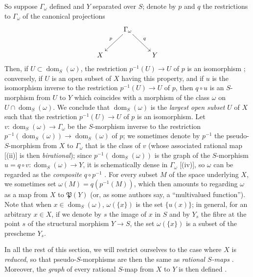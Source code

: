 \begin{env}[20.4.2]
\label{IV.20.4.2}
So suppose $\Gamma_\omega$ defined and $Y$ separated over $S$; denote by $p$ and $q$ the restrictions to $\Gamma_\omega$ of the canonical projections
\[
  \xymatrix{
  & \Gamma_\omega \ar[dl]_p \ar[dr]^q & \\
  X & & Y
  }
\]
Then, if $U\subset\operatorname{dom}_S(\omega)$, the restriction $p^{-1}(U)\to U$ of $p$ is an isomorphism ; conversely, if $U$ is an open subset of $X$ having this property, and if $u$ is the isomorphism inverse to the restriction $p^{-1}(U)\to U$ of $p$, then $q\circ u$ is an $S$-morphism from $U$ to $Y$ which coincides with a morphism of the class $\omega$ on $U\cap\operatorname{dom}_S(\omega)$.
We conclude that $\operatorname{dom}_S(\omega)$ is the \emph{largest open subset} $U$ of $X$ such that the restriction $p^{-1}(U)\to U$ of $p$ is an
isomorphism.
Let $v:\operatorname{dom}_S(\omega)\to\Gamma_\omega$ be the $S$-morphism inverse to the restriction $p^{-1}(\operatorname{dom}_S(\omega))\to\operatorname{dom}_S(\omega)$ of $p$; we sometimes denote by $p^{-1}$ the pseudo-$S$-morphism from $X$ to $\Gamma_\omega$ that is the class of $v$ (whose associated rational map [(ii)] is then \emph{birational}); since $p^{-1}(\operatorname{dom}_S(\omega))$ is the graph of the $S$-morphism $u=q\circ v:\operatorname{dom}_S(\omega)\to Y$, it is schematically dense in $\Gamma_\omega$ [(iv)], so $\omega$ can be regarded as the \emph{composite} $q\circ p^{-1}$ .
For every subset $M$ of the space underlying $X$, we sometimes set $\omega(M)=q(p^{-1}(M))$, which then amounts to regarding $\omega$ as a map from $X$ to $\mathfrak{P}(Y)$ (or, as some authors say, a ``multivalued function'').
Note that when $x\in\operatorname{dom}_S(\omega)$, $\omega(\{x\})$ is the set $\{u(x)\}$; in general, for an arbitrary $x\in X$, if we denote by $s$ the image of $x$ in $S$ and by $Y_s$ the fibre at the point $s$ of the structural morphism $Y\to S$, the set $\omega(\{x\})$ is a subset of the prescheme $Y_s$.
\end{env}

\begin{env}[20.4.3]
\label{IV.20.4.3}
In all the rest of this section, we will restrict ourselves to the case where $X$ is \emph{reduced}, so that pseudo-$S$-morphisms are then the same as \emph{rational $S$-maps} .
Moreover, the \emph{graph} of every rational $S$-map from $X$ to $Y$ is then defined .
\end{env}


